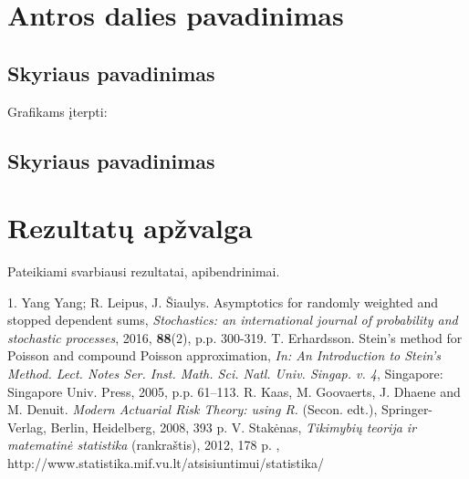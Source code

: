 \documentclass[11pt]{article}
\begin{document}
\section{Antros dalies pavadinimas}
\subsection{Skyriaus pavadinimas}
Grafikams įterpti:
\begin{figure}[h]

\end{figure}


\subsection{Skyriaus pavadinimas}

\newpage


\section{Rezultatų apžvalga}
Pateikiami svarbiausi rezultatai, apibendrinimai.

\newpage



\begin{thebibliography}{99}

1. Yang Yang; R. Leipus, J. \v{S}iaulys. Asymptotics for randomly weighted and stopped dependent sums, \emph{Stochastics: an international journal of probability and stochastic processes}, 2016, \textbf{88}(2), p.p. 300-319.
  T. Erhardsson. Stein’s method for Poisson and compound Poisson approximation, \emph{In: An Introduction to Stein’s Method. Lect. Notes Ser. Inst. Math. Sci. Natl. Univ. Singap. v. 4}, Singapore: Singapore Univ. Press, 2005, p.p. 61–113.
 R. Kaas, M. Goovaerts, J. Dhaene  and M. Denuit. \emph{Modern Actuarial Risk Theory:
using R.} (Secon. edt.), Springer-Verlag, Berlin, Heidelberg,  2008, 393 p.
 V. Stakėnas, \emph{Tikimybių teorija ir matematinė statistika} (rankraštis), 2012, 178 p. , http://www.statistika.mif.vu.lt/atsisiuntimui/statistika/

\end{thebibliography}
\newpage
\end{document}
